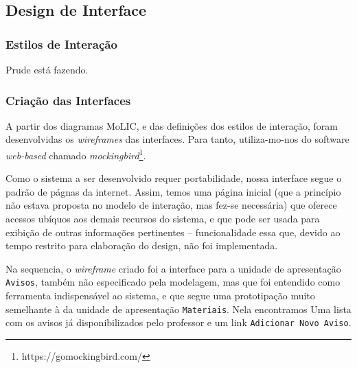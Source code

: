 	\subsection{Design de Interface}
	
		\subsubsection{Estilos de Interação}
			Prude está fazendo.
		
		\subsubsection{Criação das Interfaces}
			A partir dos diagramas MoLIC, e das definições dos estilos de interação, 
			foram desenvolvidas os \emph{wireframes} das interfaces. Para tanto, utiliza-mo-nos
			do software \emph{web-based} chamado \emph{mockingbird}\footnote{https://gomockingbird.com/}.
			
			Como o sistema a ser desenvolvido requer portabilidade, nossa 
			interface segue o padrão de págnas da internet. Assim, temos uma página 
			inicial (que a princípio não estava proposta no modelo de interação, mas fez-se
			necessária) que oferece acessos ubíquos aos demais recursos do sistema, e que 
			pode ser usada para exibição de outras informações pertinentes -- funcionalidade essa que, devido ao 
			tempo restrito para elaboração do design, não foi implementada.
			
		
			Na sequencia, o \emph{wireframe} criado foi a interface para a unidade de 
			apresentação \texttt{Avisos}, também não especificado pela modelagem, mas que foi 
			entendido como ferramenta indispensável ao sistema, e que segue uma prototipação
			muito semelhante à da unidade de apresentação \texttt{Materiais}. Nela encontramos 
			Uma lista com os avisos já disponibilizados 
			pelo professor e um link \texttt{Adicionar Novo Aviso}.
		
		
		
		
		
		
		
		
		
		
		
		
		
		
		
		
		
		
		
